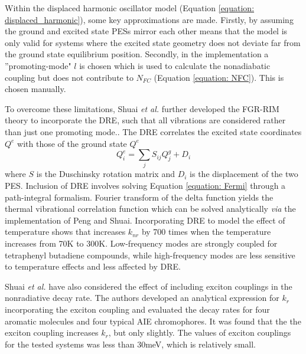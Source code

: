 Within the displaced harmonic oscillator model (Equation \ref{equation: displaced_harmonic}), some key approximations are made. Firstly, by assuming the ground and excited state \acp{PES} mirror each other means that the model is only valid for systems where the excited state geometry does not deviate far from the ground state equilibrium position. Secondly, in the implementation a ''promoting-mode" $l$ is chosen which is used to calculate the nonadiabatic coupling but does not contribute to $N_{FC}$ (Equation \ref{equation: NFC}). This is chosen manually. 

To overcome these limitations, Shuai \textit{et al.} further developed the \ac{FGR-RIM} theory to incorporate the \ac{DRE}, such that all vibrations are considered rather than just one promoting mode.\cite{Yui2005,Peng2007a,Niu2010}. The \ac{DRE} correlates the excited state coordinates $Q^{e}$ with those of the ground state $Q^{e}$
\begin{equation}
    Q^{e}_{i}=\sum_{j}S_{ij}Q^{g}_{j}+D_{i}
\end{equation}
where $S$ is the Duschinsky rotation matrix and $D_{i}$ is the displacement of the two \ac{PES}. Inclusion of \ac{DRE} involves solving Equation \ref{equation: Fermi} through a path-integral formalism. Fourier transform of the delta function yields the thermal vibrational correlation function which can be solved analytically \textit{via} the implementation of Peng and Shuai.\cite{Peng2013}
Incorporating \ac{DRE} to model the effect of temperature shows that increases $k_{nr}$ by 700 times when the temperature increases from 70K to 300K.\cite{Peng2007} Low-frequency modes are strongly coupled for tetraphenyl butadiene compounds, while high-frequency modes are less sensitive to temperature effects and less affected by \ac{DRE}. 

Shuai \textit{et al.} have also considered the effect of including exciton couplings in the nonradiative decay rate.\cite{Li2017} The authors developed an analytical expression for $k_{r}$ incorporating the exciton coupling and evaluated the decay rates for four aromatic molecules and four typical AIE chromophores. It was found that the the exciton coupling increases $k_{r}$, but only slightly. The values of exciton couplings for the tested systems was less than 30meV, which is relatively small.

